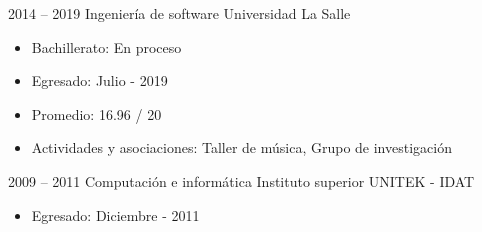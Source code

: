 
\begin{entrylist}
	\entry
		{2014 -- 2019}
		{Ingeniería de software}
		{Universidad La Salle}
		{
		    \vspace{-5mm}
		    \begin{itemize}
		        \setlength\itemsep{0pt}
		        \item Bachillerato: En proceso
		        \item Egresado: Julio - 2019
		        \item Promedio: 16.96 / 20
		        \item Actividades y asociaciones: Taller de música, Grupo de investigación
		    \end{itemize}
		}
	\entry
		{2009 -- 2011}
		{Computación e informática}
		{Instituto superior UNITEK - IDAT}
		{
		    \vspace{-5mm}
		    \begin{itemize}
		        \setlength\itemsep{0pt}
		        \item Egresado: Diciembre - 2011
		    \end{itemize}
        }
\end{entrylist}

